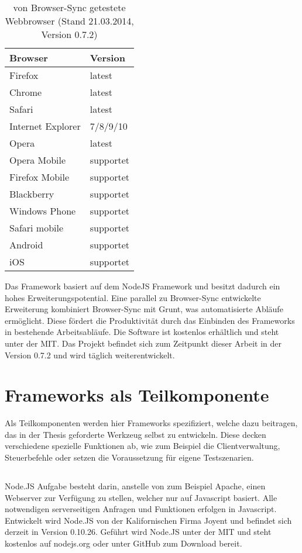 		\begin{table}[H]
 		\centering
			\begin{tabular}{| p{5cm} | p{5cm} |}
			
			\hline
				Browser 	& 	Version\\
			\hline
			\hline
				Firefox	&	latest\\
				Chrome	&	latest\\
				Safari	&	latest\\
				Internet Explorer	&	7/8/9/10\\
				Opera	&	latest\\
				Opera Mobile	&	supportet\\
				Firefox Mobile	&	supportet\\
				Blackberry	&	supportet\\
				Windows Phone	&	supportet\\
				Safari mobile	&	supportet\\	
				Android	&	supportet\\
				iOS		&	supportet\\
				\hline
				\end{tabular}
			\caption{von Browser-Sync getestete \Gls{Webbrowser} (Stand 21.03.2014, Version 0.7.2)}
	\end{table}
	
	Das \Gls{Framework} basiert auf dem \Gls{NodeJS} \Gls{Framework} und besitzt dadurch ein hohes Erweiterungspotential. Eine parallel zu Browser-Sync entwickelte Erweiterung kombiniert Browser-Sync mit \Gls{Grunt}, was automatisierte Abläufe ermöglicht. Diese fördert die Produktivität durch das Einbinden des \Gls{Framework}s in bestehende Arbeitsabläufe. Die Software ist kostenlos erhältlich und steht unter der \Gls{MIT}. Das Projekt befindet sich zum Zeitpunkt dieser Arbeit in der Version 0.7.2 und wird täglich weiterentwickelt.

\pagebreak
\section{\Gls{Framework}s als Teilkomponente}
	Als Teilkomponenten werden hier \Gls{Framework}s spezifiziert, welche dazu beitragen, das in der Thesis geforderte Werkzeug selbst zu entwickeln. Diese decken verschiedene spezielle Funktionen ab, wie zum Beispiel die Clientverwaltung, Steuerbefehle oder setzen die Voraussetzung für eigene \Gls{Test}szenarien.
	
	\subsection{}
	Node.JS Aufgabe besteht darin, anstelle von zum Beispiel \Gls{Apache}, einen Webserver zur Verfügung zu stellen, welcher nur auf \Gls{Javascript} basiert. Alle notwendigen serverseitigen Anfragen und Funktionen erfolgen in \Gls{Javascript}. Entwickelt wird Node.JS von der Kalifornischen Firma Joyent und befindet sich derzeit in Version 0.10.26. Geführt wird Node.JS unter der \Gls{MIT} und steht kostenlos auf nodejs.org oder unter GitHub zum Download bereit.
	
